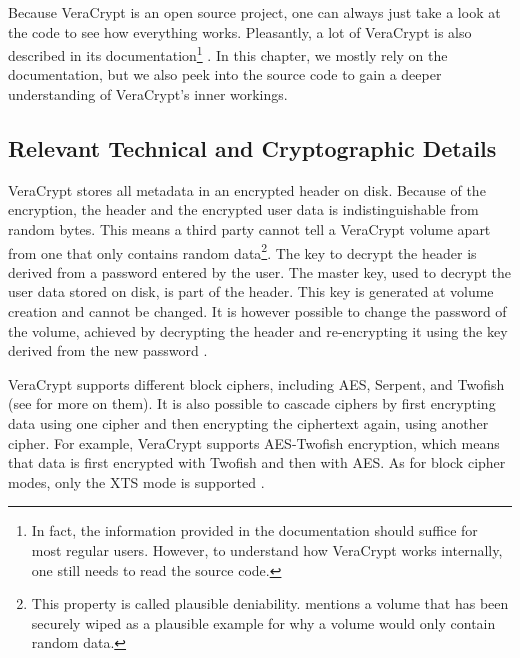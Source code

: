 
Because VeraCrypt is an open source project, one can always just take a look at the code to see how everything works. Pleasantly, a lot of VeraCrypt is also described in its documentation\footnote{\label{fn:otherapproaches.veracrypt.documentation} In fact, the information provided in the documentation should suffice for most regular users. However, to understand how VeraCrypt works internally, one still needs to read the source code.} \cite{Veracrypt}. In this chapter, we mostly rely on the documentation, but we also peek into the source code to gain a deeper understanding of VeraCrypt's inner workings.

\subsection{Relevant Technical and Cryptographic Details}
\label{chap:otherapproaches.veracrypt.details}
VeraCrypt stores all metadata in an encrypted header on disk. Because of the encryption, the header and the encrypted user data is indistinguishable from random bytes. This means a third party cannot tell a VeraCrypt volume apart from one that only contains random data\footnote{\label{fn:otherapproaches.veracrypt.deniability} This property is called plausible deniability. \cite{Veracrypt} mentions a volume that has been securely wiped as a plausible example for why a volume would only contain random data.}. The key to decrypt the header is derived from a password entered by the user. The master key, used to decrypt the user data stored on disk, is part of the header. This key is generated at volume creation and cannot be changed. It is however possible to change the password of the volume, achieved by decrypting the header and re-encrypting it using the key derived from the new password \cite{Veracrypt}.

VeraCrypt supports different block ciphers, including AES, Serpent, and Twofish (see \cite{Ferguson2010} for more on them). It is also possible to cascade ciphers by first encrypting data using one cipher and then encrypting the ciphertext again, using another cipher. For example, VeraCrypt supports AES-Twofish encryption, which means that data is first encrypted with Twofish and then with AES. As for block cipher modes, only the XTS mode is supported \cite{Veracrypt}.

